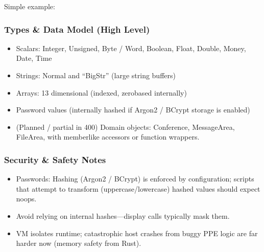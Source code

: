\documentclass[letterpaper,10pt,english]{sphinxmanual}
\begin{document}
\sphinxAtStartPar
Simple example:

\begin{sphinxVerbatim}[commandchars=\\\{\}]
  
     
\end{sphinxVerbatim}


\subsubsection{Types \& Data Model (High Level)}
\label{\detokenize{ppl:types-data-model-high-level}}\begin{itemize}
\item {} 
\sphinxAtStartPar
Scalars: Integer, Unsigned, Byte / Word, Boolean, Float, Double, Money, Date, Time

\item {} 
\sphinxAtStartPar
Strings: Normal and “BigStr” (large string buffers)

\item {} 
\sphinxAtStartPar
Arrays: 1\textendash{}3 dimensional (indexed, zero\sphinxhyphen{}based internally)

\item {} 
\sphinxAtStartPar
Password values (internally hashed if Argon2 / BCrypt storage is enabled)

\item {} 
\sphinxAtStartPar
(Planned / partial in 400) Domain objects: Conference, MessageArea, FileArea, with member\sphinxhyphen{}like accessors or function wrappers.

\end{itemize}


\subsubsection{Security \& Safety Notes}
\label{\detokenize{ppl:security-safety-notes}}\begin{itemize}
\item {} 
\sphinxAtStartPar
Passwords: Hashing (Argon2 / BCrypt) is enforced by configuration; scripts that attempt to transform (uppercase/lowercase) hashed values should expect no\sphinxhyphen{}ops.

\item {} 
\sphinxAtStartPar
Avoid relying on internal hashes—display calls typically mask them.

\item {} 
\sphinxAtStartPar
VM isolates runtime; catastrophic host crashes from buggy PPE logic are far harder now (memory safety from Rust).

\end{itemize}
\end{document}
